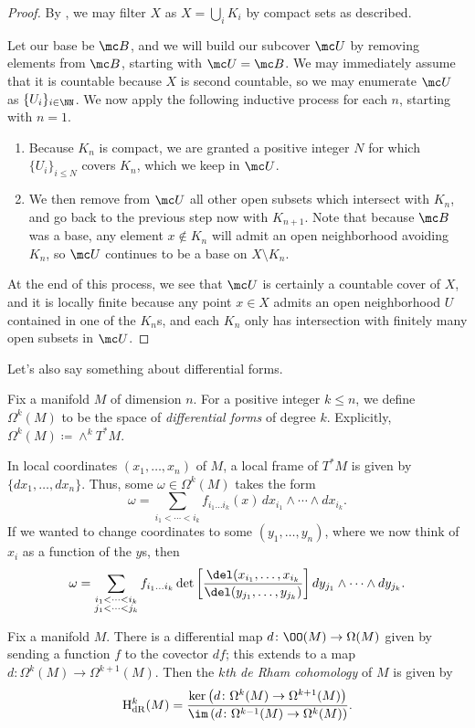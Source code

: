 \documentclass[../notes.tex]{subfiles}
\begin{document}
\begin{proof}
	By , we may filter $X$ as $X=\bigcup_iK_i$ by compact sets as described.

	Let our base be $\mc B$, and we will build our subcover $\mc U$ by removing elements from $\mc B$, starting with $\mc U=\mc B$. We may immediately assume that it is countable because $X$ is second countable, so we may enumerate $\mc U$ as $\{U_i\}_{i\in\NN}$. We now apply the following inductive process for each $n$, starting with $n=1$.
	\begin{enumerate}
		\item Because $K_n$ is compact, we are granted a positive integer $N$ for which $\{U_i\}_{i\le N}$ covers $K_n$, which we keep in $\mc U$.
		\item We then remove from $\mc U$ all other open subsets which intersect with $K_n$, and go back to the previous step now with $K_{n+1}$. Note that because $\mc B$ was a base, any element $x\notin K_n$ will admit an open neighborhood avoiding $K_n$, so $\mc U$ continues to be a base on $X\setminus K_n$.
	\end{enumerate}
	At the end of this process, we see that $\mc U$ is certainly a countable cover of $X$, and it is locally finite because any point $x\in X$ admits an open neighborhood $U$ contained in one of the $K_n$s, and each $K_n$ only has intersection with finitely many open subsets in $\mc U$.
\end{proof}
Let's also say something about differential forms.
\begin{definition}
	Fix a manifold $M$ of dimension $n$. For a positive integer $k\le n$, we define $\Omega^k(M)$ to be the space of \textit{differential forms} of degree $k$. Explicitly, $\Omega^k(M)\coloneqq\land^kT^*M$.
\end{definition}
\begin{remark}
	In local coordinates $(x_1,\ldots,x_n)$ of $M$, a local frame of $T^*M$ is given by $\{dx_1,\ldots,dx_n\}$. Thus, some $\omega\in\Omega^k(M)$ takes the form
	\[\omega=\sum_{i_1<\cdots<i_k}f_{i_1\ldots i_k}(x)\,dx_{i_1}\land\cdots\land dx_{i_k}.\]
	If we wanted to change coordinates to some $(y_1,\ldots,y_n)$, where we now think of $x_i$ as a function of the $y$s, then
	\[\omega=\sum_{\substack{i_1<\cdots<i_k\\j_1<\cdots<j_k}}f_{i_1\ldots i_k}\det\left[\frac{\del(x_{i_1},\ldots,x_{i_k}}{\del(y_{j_1},\ldots,y_{j_k})}\right]dy_{j_1}\land\cdots\land dy_{j_k}.\]
\end{remark}
\begin{definition}
	Fix a manifold $M$. There is a differential map $d\colon\OO(M)\to\Omega(M)$ given by sending a function $f$ to the covector $df$; this extends to a map $d\colon\Omega^k(M)\to\Omega^{k+1}(M)$. Then the \textit{$k$th de Rham cohomology} of $M$ is given by
	\[\mathrm H^k_{\mathrm{dR}}(M)=\frac{\ker\left(d\colon\Omega^k(M)\to\Omega^{k+1}(M)\right)}{\im\left(d\colon\Omega^{k-1}(M)\to\Omega^k(M)\right)}.\]
\end{definition}
\end{document}
